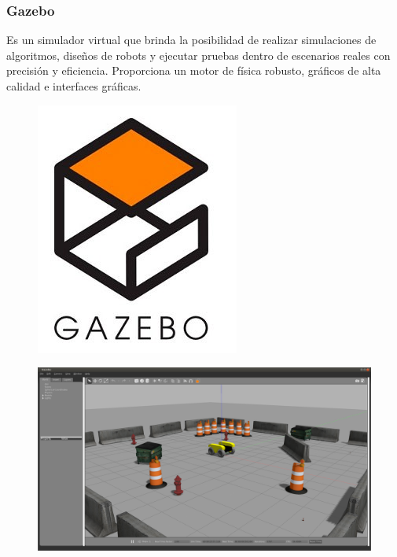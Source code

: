         \newpage    

            \subsubsection{Gazebo}
     Es un simulador virtual que brinda la posibilidad de realizar simulaciones de algoritmos, diseños de robots y ejecutar pruebas dentro de escenarios reales con precisión y eficiencia. Proporciona un motor de física robusto, gráficos de alta calidad e interfaces gráficas. 
        
        \begin{figure}[htb]
                \centering
                \includegraphics[width=0.35\linewidth]{Main/Chapter3/Images3/herramientas_4.png}
                \caption{}
                \label{f:Cap3_herramientas_4}
        \end{figure} 
    
        
        \begin{figure}[htb]
                \centering
                \includegraphics[width=1.0\linewidth]{Main/Chapter3/Images3/herramientas_3.png}
                \caption{}
                \label{f:Cap3_herramientas_3}
        \end{figure}  

